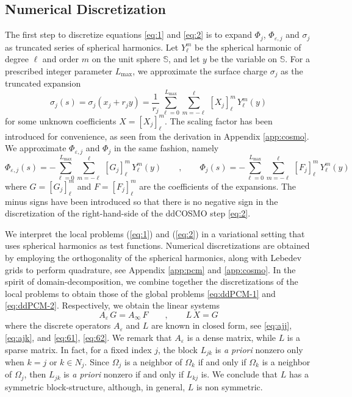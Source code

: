 \documentclass[aip,jcp,a4paper,11pt]{revtex4-1}
\begin{document}
\subsection{Numerical Discretization}

The first step to discretize equations \eqref{eq:1} and \eqref{eq:2} is to expand $\Phi_j$, $\Phi_{\varepsilon,j}$ and $\sigma_j$ as truncated series of spherical harmonics. Let $Y_\ell^m$ be the spherical harmonic of degree $\ell$ and order $m$ on the unit sphere $\mathbb{S}$, and let $y$ be the variable on $\mathbb{S}$. For a prescribed integer parameter ${L_\text{max}}$,  we approximate the surface charge $\sigma_j$ as the truncated expansion
\[
\sigma_j(s) = \sigma_j(x_j + r_j y) = \frac{1}{r_j} \, \sum_{\ell=0}^{L_\text{max}} \sum_{m = -\ell}^\ell \, [X_j]_\ell^m \, Y_\ell^m(y)
\]
for some unknown coefficients $X = [X_j]_\ell^m$. %
The scaling factor has been introduced for convenience, as seen from the derivation in Appendix \ref{app:cosmo}. We approximate $\Phi_{\varepsilon,j}$ and $\Phi_j$ in the same fashion, namely
\begin{equation}\label{eq:71}
\Phi_{\varepsilon,j}(s) = - \sum_{\ell=0}^{L_\text{max}} \sum_{m = -\ell}^\ell \, [G_j]_\ell^m \, Y_\ell^m(y) \qquad , \qquad \Phi_j(s) = -\sum_{\ell=0}^{L_\text{max}} \sum_{m = -\ell}^\ell \, [F_j]_\ell^m \, Y_\ell^m(y)
\end{equation}
where $G = [G_j]_\ell^m$ and $F = [F_j]_\ell^m$ are the coefficients of the expansions. The minus signs have been introduced so that there is no negative sign in the discretization of the right-hand-side of the ddCOSMO step \eqref{eq:2}. 


We interpret the local problems (\ref{eq:1}) and (\ref{eq:2}) in a variational setting that uses spherical harmonics as test functions. Numerical discretizations are obtained by employing the orthogonality of the spherical harmonics, along with Lebedev grids to perform quadrature, see Appendix \ref{app:pcm} and \ref{app:cosmo}. In the spirit of domain-decomposition, we combine together the discretizations of the local problems to obtain those of the global problems \eqref{eq:ddPCM-1} and \eqref{eq:ddPCM-2}. Respectively, we obtain the linear systems
\begin{equation}\label{eq:6}
A_\varepsilon \, G = A_\infty \, F \qquad , \qquad  L \, X = G
\end{equation}
where the discrete operators $A_\varepsilon$ and $L$ are known in closed form, see \eqref{eq:ajj}, \eqref{eq:ajk}, and \eqref{eq:61}, \eqref{eq:62}. We remark that $A_\varepsilon$ is a dense matrix, while $L$ is a sparse matrix. In fact, for a fixed index $j$, the block $L_{jk}$ is \emph{a priori} nonzero only when $k = j$ or $k \in N_j$. Since $\Omega_j$ is a neighbor of $\Omega_k$ if and only if $\Omega_k$ is a neighbor of $\Omega_j$, then $L_{jk}$ is \emph{a priori} nonzero if and only if $L_{kj}$ is. We conclude that $L$ has a symmetric block-structure, although, in general, $L$ is non symmetric.
\end{document}
